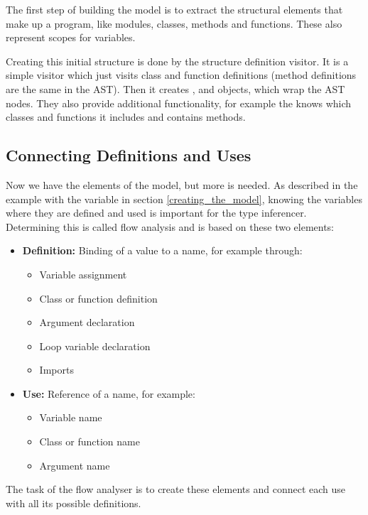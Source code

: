 \documentclass[12pt,halfparskip,DIV11,BCOR10mm]{scrreprt}
\begin{document}
The first step of building the model is to extract the structural elements that make up a program, like modules, classes, methods and functions. These also represent scopes for variables.

Creating this initial structure is done by the structure definition visitor. It is a simple visitor which just visits class and function definitions (method definitions are the same in the AST). Then it creates ,  and  objects, which wrap the AST nodes. They also provide additional functionality, for example the  knows which classes and functions it includes and  contains methods.

\subsection{Connecting Definitions and Uses}

Now we have the elements of the model, but more is needed. As described in the example with the  variable in section \vref{creating_the_model}, knowing the variables where they are defined and used is important for the type inferencer. Determining this is called flow analysis and is based on these two elements:

\begin{itemize}
    \item \textbf{Definition:} Binding of a value to a name, for example through:
    \begin{itemize}
        \item Variable assignment
        \item Class or function definition
        \item Argument declaration
        \item Loop variable declaration
        \item Imports
    \end{itemize}
    \item \textbf{Use:} Reference of a name, for example:
    \begin{itemize}
        \item Variable name
        \item Class or function name
        \item Argument name
    \end{itemize}
\end{itemize}

The task of the flow analyser is to create these elements and connect each use with all its possible definitions.
\end{document}
